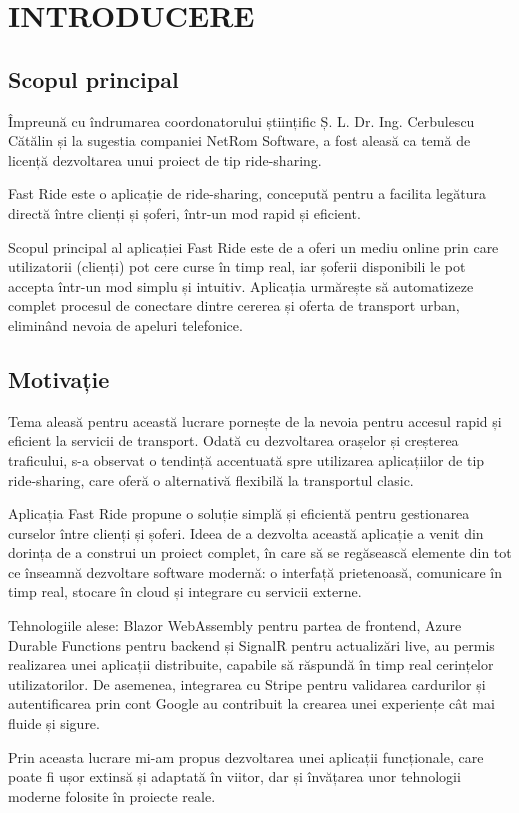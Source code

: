 \chapter{INTRODUCERE}
\section{Scopul principal}
Împreună cu îndrumarea coordonatorului științific Ș. L. Dr. Ing. Cerbulescu Cătălin și la sugestia companiei NetRom Software, a fost aleasă ca temă de licență dezvoltarea unui proiect de tip ride-sharing.

Fast Ride este o aplicație de ride-sharing, concepută pentru a facilita legătura directă între clienți și șoferi, într-un mod rapid și eficient.

Scopul principal al aplicației Fast Ride este de a oferi un mediu online prin care utilizatorii (clienți) pot cere curse în timp real, iar șoferii disponibili le pot accepta într-un mod simplu și intuitiv. Aplicația urmărește să automatizeze complet procesul de conectare dintre cererea și oferta de transport urban, eliminând nevoia de apeluri telefonice.

\section{Motivație}
Tema aleasă pentru această lucrare pornește de la nevoia pentru accesul rapid și eficient la servicii de transport. Odată cu dezvoltarea orașelor și creșterea traficului, s-a observat o tendință accentuată spre utilizarea aplicațiilor de tip ride-sharing, care oferă o alternativă flexibilă la transportul clasic.

Aplicația Fast Ride propune o soluție simplă și eficientă pentru gestionarea curselor între clienți și șoferi. Ideea de a dezvolta această aplicație a venit din dorința de a construi un proiect complet, în care să se regăsească elemente din tot ce înseamnă dezvoltare software modernă: o interfață prietenoasă, comunicare în timp real, stocare în cloud și integrare cu servicii externe.

Tehnologiile alese: Blazor WebAssembly pentru partea de frontend, Azure Durable Functions pentru backend și SignalR pentru actualizări live, au permis realizarea unei aplicații distribuite, capabile să răspundă în timp real cerințelor utilizatorilor. De asemenea, integrarea cu Stripe pentru validarea cardurilor și autentificarea prin cont Google au contribuit la crearea unei experiențe cât mai fluide și sigure.

Prin aceasta lucrare mi-am propus dezvoltarea unei aplicații funcționale, care poate fi ușor extinsă și adaptată în viitor, dar și învățarea unor tehnologii moderne folosite în proiecte reale.